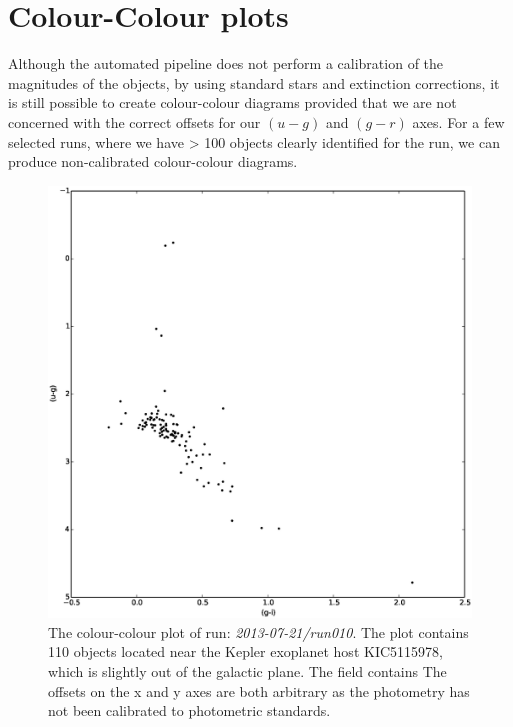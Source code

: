 \section{Colour-Colour plots}
Although the automated pipeline does not perform a calibration of the magnitudes of the objects, by using standard stars and extinction corrections, it is still possible to create colour-colour diagrams provided that we are not concerned with the correct offsets for our $(u-g)$ and $(g-r)$ axes. For a few selected runs, where we have > 100 objects clearly identified for the run, we can produce non-calibrated colour-colour diagrams. 

\begin{figure}
\centering
\includegraphics[width=120mm]{images/2013-07-21-run010-2colour.eps}
\caption{The colour-colour plot of run: \emph{2013-07-21/run010}. The plot contains 110 objects located near the Kepler exoplanet host KIC5115978, which is slightly out of the galactic plane. The field contains The offsets on the x and y axes are both arbitrary as the photometry has not been calibrated to photometric standards.}
\label{fig:differentialtrad}
\end{figure}

